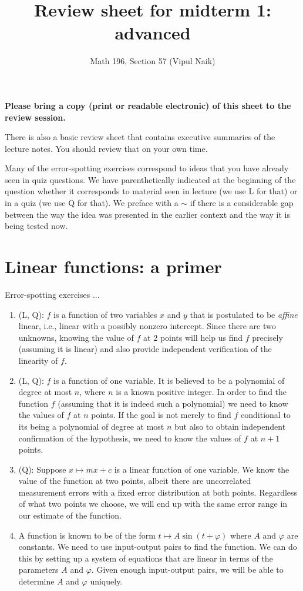 \documentclass[10pt]{amsart}
\title{Review sheet for midterm 1: advanced}
\author{Math 196, Section 57 (Vipul Naik)}
\begin{document}
\maketitle

{\bf Please bring a copy (print or readable electronic) of this sheet
  to the review session.}

There is also a basic review sheet that contains executive summaries
of the lecture notes. You should review that on your own time.

Many of the error-spotting exercises correspond to ideas that you have
already seen in quiz questions. We have parenthetically indicated at
the beginning of the question whether it corresponds to material seen
in lecture (we use L for that) or in a quiz (we use Q for that). We
preface with a $\sim$ if there is a considerable gap between the way
the idea was presented in the earlier context and the way it is being
tested now.

\section{Linear functions: a primer}

Error-spotting exercises ...

\begin{enumerate}

\item (L, Q): $f$ is a function of two variables $x$ and $y$ that is
  postulated to be {\em affine} linear, i.e., linear with a possibly
  nonzero intercept. Since there are two unknowns, knowing the value
  of $f$ at $2$ points will help us find $f$ precisely (assuming it is
  linear) and also provide independent verification of the linearity
  of $f$.
\item (L, Q): $f$ is a function of one variable. It is believed to be
  a polynomial of degree at most $n$, where $n$ is a known positive
  integer. In order to find the function $f$ (assuming that it is
  indeed such a polynomial) we need to know the values of $f$ at $n$
  points. If the goal is not merely to find $f$ conditional to its
  being a polynomial of degree at most $n$ but also to obtain
  independent confirmation of the hypothesis, we need to know the
  values of $f$ at $n + 1$ points.
\item (Q): Suppose $x \mapsto mx + c$ is a linear function of one
  variable. We know the value of the function at two points, albeit
  there are uncorrelated measurement errors with a fixed error
  distribution at both points. Regardless of what two points we
  choose, we will end up with the same error range in our estimate of
  the function.
\item A function is known to be of the form $t \mapsto A \sin(t +
  \varphi)$ where $A$ and $\varphi$ are constants. We need to use
  input-output pairs to find the function. We can do this by setting
  up a system of equations that are linear in terms of the parameters
  $A$ and $\varphi$. Given enough input-output pairs, we will be able
  to determine $A$ and $\varphi$ uniquely.
\end{enumerate}
\end{document}
